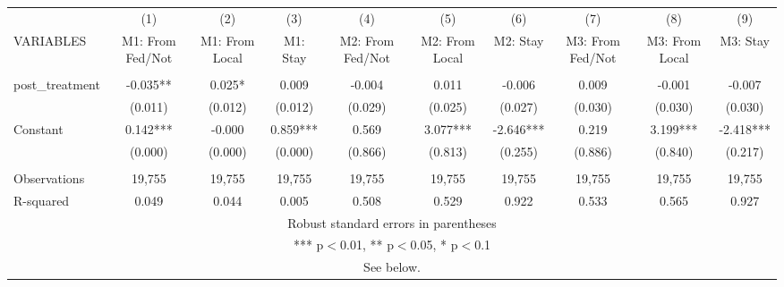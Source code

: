 \begin{tabular}{lccccccccc} \hline
 & (1) & (2) & (3) & (4) & (5) & (6) & (7) & (8) & (9) \\
VARIABLES & M1: From Fed/Not & M1: From Local & M1: Stay & M2: From Fed/Not & M2: From Local & M2: Stay & M3: From Fed/Not & M3: From Local & M3: Stay \\ \hline
 &  &  &  &  &  &  &  &  &  \\
post\_treatment & -0.035** & 0.025* & 0.009 & -0.004 & 0.011 & -0.006 & 0.009 & -0.001 & -0.007 \\
 & (0.011) & (0.012) & (0.012) & (0.029) & (0.025) & (0.027) & (0.030) & (0.030) & (0.030) \\
Constant & 0.142*** & -0.000 & 0.859*** & 0.569 & 3.077*** & -2.646*** & 0.219 & 3.199*** & -2.418*** \\
 & (0.000) & (0.000) & (0.000) & (0.866) & (0.813) & (0.255) & (0.886) & (0.840) & (0.217) \\
 &  &  &  &  &  &  &  &  &  \\
Observations & 19,755 & 19,755 & 19,755 & 19,755 & 19,755 & 19,755 & 19,755 & 19,755 & 19,755 \\
 R-squared & 0.049 & 0.044 & 0.005 & 0.508 & 0.529 & 0.922 & 0.533 & 0.565 & 0.927 \\ \hline
\multicolumn{10}{c}{ Robust standard errors in parentheses} \\
\multicolumn{10}{c}{ *** p$<$0.01, ** p$<$0.05, * p$<$0.1} \\
\multicolumn{10}{c}{ See below.} \\
\end{tabular}
